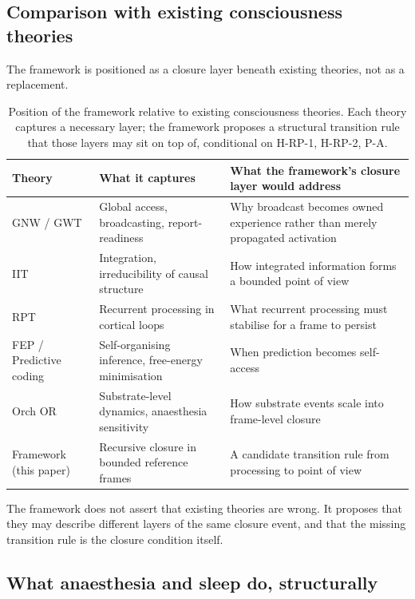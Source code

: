\documentclass[11pt]{article}
\theoremstyle{plain}
\theoremstyle{definition}
\theoremstyle{remark}
\begin{document}
\subsection{Comparison with existing consciousness theories}

The framework is positioned as a closure layer beneath existing theories, not as a replacement.

\begin{table}[h]
\centering
\small
\caption{Position of the framework relative to existing consciousness theories. Each theory captures a necessary layer; the framework proposes a structural transition rule that those layers may sit on top of, conditional on H-RP-1, H-RP-2, P-A.}\label{tab:theory-comparison}
\begin{tabular}{p{2.5cm}p{4cm}p{4cm}}
\toprule
Theory & What it captures & What the framework's closure layer would address \\
\midrule
GNW / GWT~\citep{ConsciousnessAdversarial} & Global access, broadcasting, report-readiness & Why broadcast becomes owned experience rather than merely propagated activation \\
IIT & Integration, irreducibility of causal structure & How integrated information forms a bounded point of view \\
RPT & Recurrent processing in cortical loops & What recurrent processing must stabilise for a frame to persist \\
FEP / Predictive coding~\citep{FristonFreeEnergy} & Self-organising inference, free-energy minimisation & When prediction becomes self-access \\
Orch OR~\citep{OrchOR2025} & Substrate-level dynamics, anaesthesia sensitivity & How substrate events scale into frame-level closure \\
\midrule
Framework (this paper) & Recursive closure in bounded reference frames & A candidate transition rule from processing to point of view \\
\bottomrule
\end{tabular}
\end{table}

The framework does not assert that existing theories are wrong. It proposes that they may describe different layers of the same closure event, and that the missing transition rule is the closure condition itself.

\subsection{What anaesthesia and sleep do, structurally}
\end{document}

